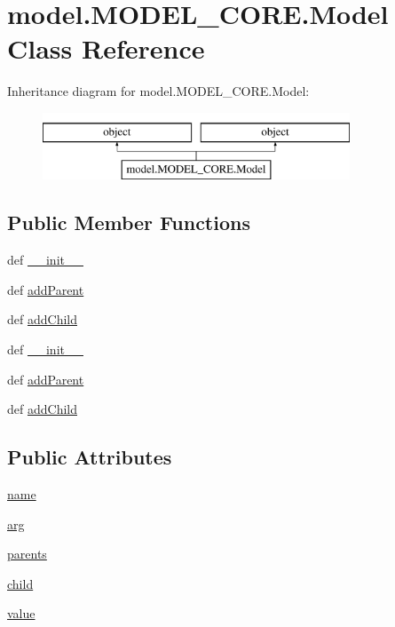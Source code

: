 \hypertarget{classmodel_1_1MODEL__CORE_1_1Model}{}\section{model.\+M\+O\+D\+E\+L\+\_\+\+C\+O\+R\+E.\+Model Class Reference}
\label{classmodel_1_1MODEL__CORE_1_1Model}
Inheritance diagram for model.\+M\+O\+D\+E\+L\+\_\+\+C\+O\+R\+E.\+Model\+:\begin{figure}[H]
\begin{center}
\leavevmode
\includegraphics[height=2.000000cm]{classmodel_1_1MODEL__CORE_1_1Model}
\end{center}
\end{figure}
\subsection*{Public Member Functions}
\begin{DoxyCompactItemize}
\item 
def \hyperlink{classmodel_1_1MODEL__CORE_1_1Model_a1176b19897a48d0ad5caa2206abc48c2}{\+\_\+\+\_\+init\+\_\+\+\_\+}
\item 
def \hyperlink{classmodel_1_1MODEL__CORE_1_1Model_a3ef7c7b720e9dc220758de25f1ec8e62}{add\+Parent}
\item 
def \hyperlink{classmodel_1_1MODEL__CORE_1_1Model_a0ce62fa25018f20b53b36b38d73f61c3}{add\+Child}
\item 
def \hyperlink{classmodel_1_1MODEL__CORE_1_1Model_a1176b19897a48d0ad5caa2206abc48c2}{\+\_\+\+\_\+init\+\_\+\+\_\+}
\item 
def \hyperlink{classmodel_1_1MODEL__CORE_1_1Model_a3ef7c7b720e9dc220758de25f1ec8e62}{add\+Parent}
\item 
def \hyperlink{classmodel_1_1MODEL__CORE_1_1Model_a0ce62fa25018f20b53b36b38d73f61c3}{add\+Child}
\end{DoxyCompactItemize}
\subsection*{Public Attributes}
\begin{DoxyCompactItemize}
\item 
\hyperlink{classmodel_1_1MODEL__CORE_1_1Model_adef94b9beef9e75387319ac303823d1e}{name}
\item 
\hyperlink{classmodel_1_1MODEL__CORE_1_1Model_aa25b1292a953fba30ad2bd5bd895fba6}{arg}
\item 
\hyperlink{classmodel_1_1MODEL__CORE_1_1Model_a825d8f80266a50175b837454e720edea}{parents}
\item 
\hyperlink{classmodel_1_1MODEL__CORE_1_1Model_a4d0bad8b1bea374b88baeebe5faf3e5c}{child}
\item 
\hyperlink{classmodel_1_1MODEL__CORE_1_1Model_a3cd14a8cfe0b78fe365e968d2f535bb3}{value}
\end{DoxyCompactItemize}


